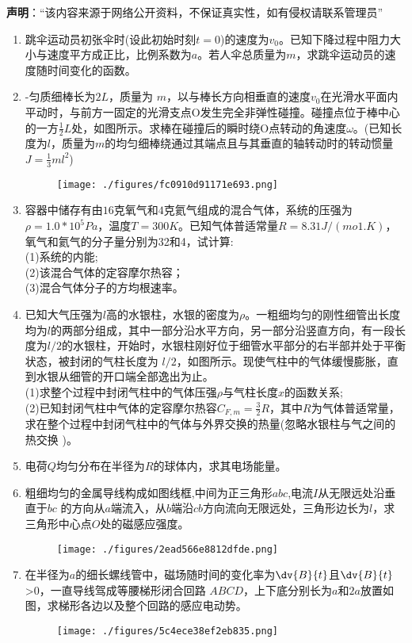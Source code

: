 
\textbf{声明}：“该内容来源于网络公开资料，不保证真实性，如有侵权请联系管理员”

\begin{enumerate}
\item 跳伞运动员初张伞时(设此初始时刻$t=0$)的速度为$v_0$。已知下降过程中阻力大小与速度平方成正比，比例系数为$a$。若人伞总质量为$m$，求跳伞运动员的速度随时间变化的函数。
\item -匀质细棒长为$ 2L$，质量为 $m$，以与棒长方向相垂直的速度$v_0$在光滑水平面内平动时，与前方一固定的光滑支点O发生完全非弹性碰撞。碰撞点位于棒中心的一方$\frac{1}{2}L$处，如图所示。求棒在碰撞后的瞬时绕O点转动的角速度$\omega$。(已知长度为$l$，质量为$m$的均匀细棒绕通过其端点且与其垂直的轴转动时的转动惯量$J=\frac{1}{3}ml^2$)
\begin{figure}[ht]
\centering
\texttt{[image: ./figures/fc0910d91171e693.png]}
\caption{} \label{fig_XD11_1}
\end{figure}
\item 容器中储存有由$16$克氧气和$4$克氦气组成的混合气体，系统的压强为$\rho=1.0*10^5Pa$，温度$T=300K$。已知气体普适常量$R=8.31J/(mo1.K)$，氧气和氦气的分子量分别为32和4，试计算:\\
(1)系统的内能;\\
(2)该混合气体的定容摩尔热容；\\
(3)混合气体分子的方均根速率。
\item 已知大气压强为$l$高的水银柱，水银的密度为$\rho$。一粗细均匀的刚性细管出长度均为$l$的两部分组成，其中一部分沿水平方向，另一部分沿竖直方向，有一段长度为$l/2$的水银柱，开始时，水银柱刚好位于细管水平部分的右半部并处于平衡状态，被封闭的气柱长度为 $l/2$，如图所示。现使气柱中的气体缓慢膨胀，直到水银从细管的开口端全部逸出为止。\\
(1)求整个过程中封闭气柱中的气体压强$\rho$与气柱长度$x$的函数关系;\\
(2)已知封闭气柱中气体的定容摩尔热容$C_{F,m}=\frac{3}{2}R$，其中$R$为气体普适常量，求在整个过程中封闭气柱中的气体与外界交换的热量(忽略水银柱与气之间的热交换 )。
\item 电荷$Q$均匀分布在半径为$R$的球体内，求其电场能量。
\item 粗细均匀的金属导线构成如图线框,中间为正三角形$abc$,电流$I$从无限远处沿垂直于$bc$ 的方向从$a$端流入，从$b$端沿$cb$方向流向无限远处，三角形边长为$l$，求三角形中心点$O$处的磁感应强度。
\begin{figure}[ht]
\centering
\texttt{[image: ./figures/2ead566e8812dfde.png]}
\caption{} \label{fig_XD11_2}
\end{figure}
\item 在半径为$a$的细长螺线管中，磁场随时间的变化率为$\dv{B}{t}$且$\dv{B}{t}$>0，一直导线驾成等腰梯形闭合回路 $ABCD$，上下底分别长为$a$和$2a$放置如图，求梯形各边以及整个回路的感应电动势。
\begin{figure}[ht]
\centering
\texttt{[image: ./figures/5c4ece38ef2eb835.png]}
\caption{} \label{fig_XD11_3}
\end{figure}
\end{enumerate}